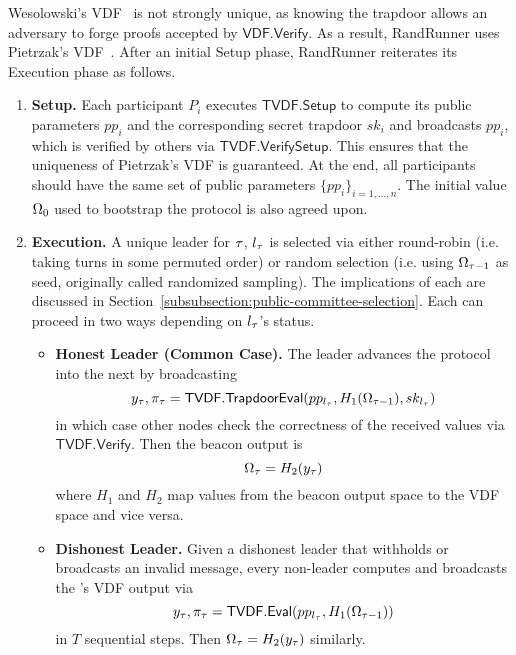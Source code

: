 Wesolowski's VDF~\cite{wesolowski2019efficient} is not strongly unique, as knowing the trapdoor allows an adversary to forge proofs accepted by $\mathsf{VDF.Verify}$. As a result, RandRunner uses Pietrzak's VDF~\cite{pietrzak2018simple}. After an initial Setup phase, RandRunner reiterates its Execution phase as follows.
\begin{enumerate}
    \item \textbf{Setup.} Each participant $P_i$ executes $\mathsf{TVDF.Setup}$ to compute its public parameters $pp_i$ and the corresponding secret trapdoor $sk_i$ and broadcasts $pp_i$, which is verified by others via $\mathsf{TVDF.VerifySetup}$. This ensures that the uniqueness of Pietrzak's VDF is guaranteed. At the end, all participants should have the same set of public parameters $\{pp_i\}_{i = 1, ..., n}$. The initial value $\Omega_0$ used to bootstrap the protocol is also agreed upon.
    \item \textbf{Execution.} A unique leader for \epoch $\tau$, $l_\tau$ is selected via either round-robin (i.e. taking turns in some permuted order) or random selection (i.e. using $\Omega_{\tau - 1}$ as seed, originally called randomized sampling). The implications of each are discussed in Section~\ref{subsubsection:public-committee-selection}. Each \epoch can proceed in two ways depending on $l_\tau$'s status.
    \begin{itemize}
        \item \textbf{Honest Leader (Common Case).} The leader advances the protocol into the next \epoch by broadcasting
        $$y_\tau, \pi_\tau = \mathsf{TVDF.TrapdoorEval}(pp_{l_\tau}, H_1(\Omega_{\tau - 1}), sk_{l_\tau})$$
        in which case other nodes check the correctness of the received values via $\mathsf{TVDF.Verify}$. Then the beacon output is
        $$\Omega_\tau = H_2(y_\tau)$$
        where $H_1$ and $H_2$ map values from the beacon output space to the VDF space and vice versa.
        \item \textbf{Dishonest Leader.} Given a dishonest leader that withholds or broadcasts an invalid message, every non-leader computes and broadcasts the \epoch's VDF output via
        $$y_\tau, \pi_\tau = \mathsf{TVDF.Eval}(pp_{l_\tau}, H_1(\Omega_{\tau - 1}))$$
        in $T$ sequential steps. Then $\Omega_\tau = H_2(y_\tau)$ similarly.
    \end{itemize}
\end{enumerate}

